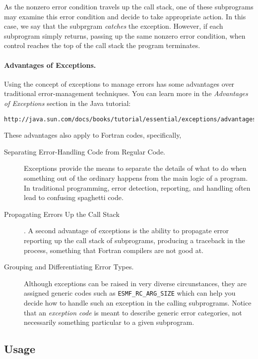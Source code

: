 As the nonzero error condition travels up the call stack, one of these
subprograms may examine this error condition and decide to take
appropriate action.  In this case, we say that the subprgram {\em
catches} the exception. However, if each subprogram simply returns,
passing up the same nonzero error condition, when control reaches the
top of the call stack the program terminates.

\paragraph{Advantages of Exceptions.} Using the concept of exceptions
to manage errors has some advantages over traditional error-management
techniques. You can learn more in the {\em Advantages of Exceptions}
section in the Java tutorial:
\begin{verbatim}
http://java.sun.com/docs/books/tutorial/essential/exceptions/advantages.html
\end{verbatim}
These advantages also apply to Fortran codes, specifically,
\begin{description}

\item[Separating Error-Handling Code from Regular Code.] Exceptions
  provide the means to separate the details of what to do when
  something out of the ordinary happens from the main logic of a
  program. In traditional programming, error detection, reporting, and
  handling often lead to confusing spaghetti code.
  
\item[Propagating Errors Up the Call Stack].  A second advantage of
  exceptions is the ability to propagate error reporting up the call
  stack of subprograms, producing a traceback in the process,
  something that Fortran compilers are not good at.

\item[Grouping and Differentiating Error Types.] Although exceptions
  can be raised in very diverse circunstances, they are assigned
  generic codes such as {\tt ESMF\_RC\_ARG\_SIZE} which can help you
  decide how to handle such an exception in the calling
  subprograms. Notice that an {\em exception code} is meant to
  describe generic error categories, not necessarily something
  particular to a given subprogram.
\end{description}

\subsection*{Usage}

